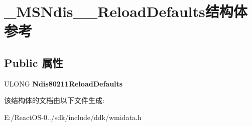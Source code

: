 \hypertarget{struct___m_s_ndis__80211___reload_defaults}{}\section{\+\_\+\+M\+S\+Ndis\+\_\+\_\+\+Reload\+Defaults结构体 参考}
\label{struct___m_s_ndis__80211___reload_defaults}
\subsection*{Public 属性}
\begin{DoxyCompactItemize}
\item 
\mbox{\label{struct___m_s_ndis__80211___reload_defaults_af71864d1f4a68be563976c282164bc0d}} 
U\+L\+O\+NG {\bfseries Ndis80211\+Reload\+Defaults}
\end{DoxyCompactItemize}


该结构体的文档由以下文件生成\+:\begin{DoxyCompactItemize}
\item 
E\+:/\+React\+O\+S-\/0../sdk/include/ddk/wmidata.\+h\end{DoxyCompactItemize}
